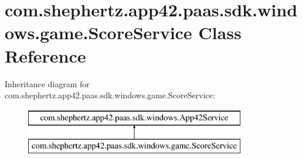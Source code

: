 \hypertarget{classcom_1_1shephertz_1_1app42_1_1paas_1_1sdk_1_1windows_1_1game_1_1_score_service}{\section{com.\+shephertz.\+app42.\+paas.\+sdk.\+windows.\+game.\+Score\+Service Class Reference}
\label{classcom_1_1shephertz_1_1app42_1_1paas_1_1sdk_1_1windows_1_1game_1_1_score_service}
}


 


Inheritance diagram for com.\+shephertz.\+app42.\+paas.\+sdk.\+windows.\+game.\+Score\+Service\+:\begin{figure}[H]
\begin{center}
\leavevmode
\includegraphics[height=2.000000cm]{classcom_1_1shephertz_1_1app42_1_1paas_1_1sdk_1_1windows_1_1game_1_1_score_service}
\end{center}
\end{figure}
